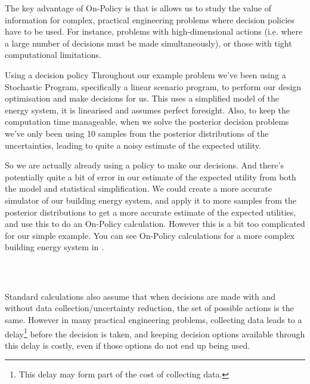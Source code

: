 The key advantage of On-Policy  is that is allows us to study the value of information for complex, practical engineering problems where decision policies have to be used. For instance, problems with high-dimensional actions (i.e. where a large number of decisions must be made simultaneously), or those with tight computational limitations.

\begin{ebox}{Using a decision policy}
    Throughout our example problem we've been using a Stochastic Program, specifically a linear scenario program, to perform our design optimisation and make decisions for us. This  uses a simplified model of the energy system, it is linearised and assumes perfect foresight. Also, to keep the computation time manageable, when we solve the posterior decision problems we've only been using 10 samples from the posterior distributions of the uncertainties, leading to quite a noisy estimate of the expected utility.

    So we are actually already using a policy to make our decisions. And there's potentially quite a bit of error in our estimate of the expected utility from both the model and statistical simplification. We could create a more accurate simulator of our building energy system, and apply it to more samples from the posterior distributions to get a more accurate estimate of the expected utilities, and use this to do an On-Policy  calculation. However this is a bit too complicated for our simple example.
    You can see On-Policy  calculations for a more complex building energy system in .
\end{ebox}\


\subsection{} \label{sec:methodology-optionality}


Standard  calculations also assume that when decisions are made with and without data collection/uncertainty reduction, the set of possible actions is the same. However in many practical engineering problems, collecting data leads to a delay\footnote{This delay may form part of the cost of collecting data.} before the decision is taken, and keeping decision options available through this delay is costly, even if those options do not end up being used.\\

